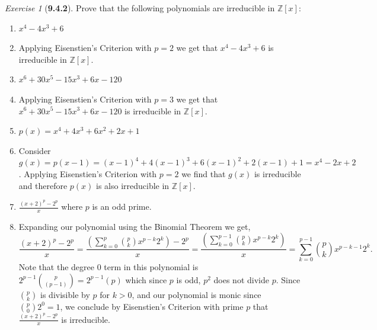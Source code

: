 \documentclass[12pt]{amsart}
\makeatletter
\theoremstyle{remark}
\newtheorem*{exercise}{Exercise}%
\def\ZZ{\ensuremath{\mathbb Z}}
\renewenvironment{proof}[1][\proofname]{\par\doublespacing
  \pushQED{\qed}%
  \normalfont \topsep6\p@\@plus6\p@\relax
  \list{}{%
    \settowidth{\leftmargin}{\itshape\proofname:\hskip\labelsep}%
    \setlength{\labelwidth}{0pt}%
    \setlength{\itemindent}{-\leftmargin}%
  }%
  \item[\hskip\labelsep\itshape#1\@addpunct{:}]\ignorespaces
}{%
  \popQED\endlist\@endpefalse
  \singlespacing
}
\theoremstyle{mycomment}
\makeatother
\begin{document}
\begin{exercise}[\textbf{9.4.2}] Prove that the following polynomials are irreducible in $\ZZ[x]$: 
  \begin{enumerate}
    \item[(a)] $x^4 - 4x^3 + 6$
    \begin{proof}Applying Eisenstien's Criterion with $p = 2$ we get that $x^4 - 4x^3 + 6$ is irreducible in $\ZZ[x]$. 
    \end{proof}
    \vspace{.15in}

    \item[(b)] $x^6 + 30x^5 - 15x^3 + 6x - 120$
    \begin{proof}Applying Eisenstien's Criterion with $p = 3$ we get that $x^6 + 30x^5 - 15x^3 + 6x - 120$ is irreducible in $\ZZ[x]$. 
    \end{proof}
    \vspace{.15in}

    \item[(c)] $p(x) = x^4 + 4x^3 + 6x^2 + 2x + 1$
    \begin{proof}Consider $g(x) = p(x - 1) = (x - 1)^4 + 4(x - 1)^3 + 6(x - 1)^2 + 2(x - 1) + 1 = x^4 - 2x + 2$. Applying Eisenstien's Criterion with $p = 2$ we find that $g(x)$ is irreducible and therefore $p(x)$ is also irreducible in $\ZZ[x]$.
    \end{proof}

      \vspace{.15in}

    \item[(d)] $\frac{(x + 2)^p - 2^p}{x}$ where $p$ is an odd prime. 
    \begin{proof} Expanding our polynomial using the Binomial Theorem we get, 
      \begin{equation*}
        \frac{(x + 2)^p - 2^p}{x} = \frac{\left(\sum_{k = 0}^p {p \choose k}x^{p - k}2^k\right) - 2^p}{x} = \frac{\left(\sum_{k = 0}^{p - 1} {p \choose k}x^{p - k}2^k\right)}{x} = \sum_{k = 0}^{p - 1} {p \choose k}x^{p - k - 1}2^k.
      \end{equation*}
      Note that the degree 0 term in this polynomial is $2^{p - 1}{p \choose (p - 1)} = 2^{p - 1}(p)$ which since $p$ is odd, $p^2$ does not divide $p$. Since ${p \choose k}$ is divisible by $p$ for $k > 0$, and our polynomial is monic since ${p \choose 0}2^0 = 1$, we conclude by Eisenstien's Criterion with prime $p$ that $\frac{(x + 2)^p - 2^p}{x}$ is irreducible. 

    \end{proof}

  \end{enumerate}
\end{exercise}
\vspace{.5in}
\end{document}
